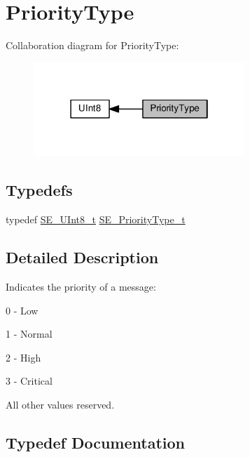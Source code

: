 \hypertarget{group__PriorityType}{}\section{Priority\+Type}
\label{group__PriorityType}
Collaboration diagram for Priority\+Type\+:\nopagebreak
\begin{figure}[H]
\begin{center}
\leavevmode
\includegraphics[width=226pt]{group__PriorityType}
\end{center}
\end{figure}
\subsection*{Typedefs}
\begin{DoxyCompactItemize}
\item 
typedef \hyperlink{group__UInt8_gaf7c365a1acfe204e3a67c16ed44572f5}{S\+E\+\_\+\+U\+Int8\+\_\+t} \hyperlink{group__PriorityType_ga809c127a21bbe2efe64f393fa04be0c3}{S\+E\+\_\+\+Priority\+Type\+\_\+t}
\end{DoxyCompactItemize}


\subsection{Detailed Description}
Indicates the priority of a message\+:

0 -\/ Low

1 -\/ Normal

2 -\/ High

3 -\/ Critical

All other values reserved. 

\subsection{Typedef Documentation}
\mbox{\label{group__PriorityType_ga809c127a21bbe2efe64f393fa04be0c3}} 
